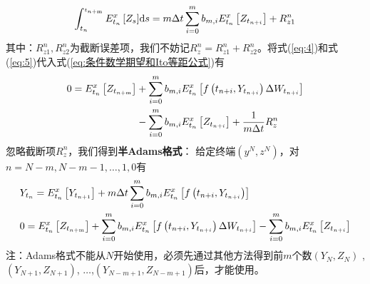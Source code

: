 					\begin{align}\label{eq:5}
					\int_{{t_n}}^{_{{t_{n{\rm{ + m}}}}}} {E_{{t_n}}^x\left[ {{Z_s}} \right]} \mathrm{d}s = m\Delta t\sum\limits_{i = 0}^m {{b_{m,i}}} E_{{t_n}}^x\left[ {{Z_{{t_{n + i}}}}} \right] + R_{z1}^n
					\end{align}
			其中：$R_{z1}^n ,R_{z2}^n$为截断误差项，我们不妨记$R_z^n=R_{z1}^n+R_{z2}^n$。将式(\ref{eq:4})和式(\ref{eq:5})代入式(\ref{eq:条件数学期望和Ito等距公式})有
					\begin{equation*}
					\begin{split}
					0 = E_{{t_n}}^x\left[ {{Z_{{t_{n{\rm{ + m}}}}}}} \right] &+ \sum\limits_{i = 0}^m {{b_{m,i}}} E_{{t_n}}^x\left[ {f\left( {{t_{n + i}},{Y_{{t_{n + i}}}}} \right)\Delta {W_{{t_{n + i}}}}} \right]\\
					& - \sum\limits_{i = 0}^m {{b_{m,i}}} E_{{t_n}}^x\left[ {{Z_{{t_{n + i}}}}} \right] + \frac{1}{{m\Delta t}}R_{z}^n
					\end{split}
					\end{equation*}
			忽略截断项$R_z^n$，我们得到\textbf{半Adams格式}：
			给定终端$(y^N,z^N)$，对$n=N-m,N-m-1,\ldots,1,0$有
			\begin{align*}
			& {Y_{{t_n}}} = E_{{t_n}}^x\left[ {{Y_{{t_{n + 1}}}}} \right] + m\Delta t\sum\limits_{i = 0}^m {{b_{m,i}}} E_{{t_n}}^x\left[ {f\left( {{t_{n + i}},{Y_{{t_{n + i}}}}} \right)} \right]\\
			& 0 = E_{{t_n}}^x\left[ {{Z_{{t_{n{\rm{ + m}}}}}}} \right] + \sum\limits_{i = 0}^m {{b_{m,i}}} E_{{t_n}}^x\left[ {f\left( {{t_{n + i}},{Y_{{t_{n + i}}}}} \right)\Delta {W_{{t_{n + i}}}}} \right] - \sum\limits_{i = 0}^m {{b_{m,i}}} E_{{t_n}}^x\left[ {{Z_{{t_{n + i}}}}} \right]
			\end{align*}
			注：Adams格式不能从$N$开始使用，必须先通过其他方法得到前$m$个数$(Y_N,Z_N)$ ,$(Y_{N+1},Z_{N+1})$, $\ldots$,$(Y_{N-m+1},Z_{N-m+1})$后，才能使用。
